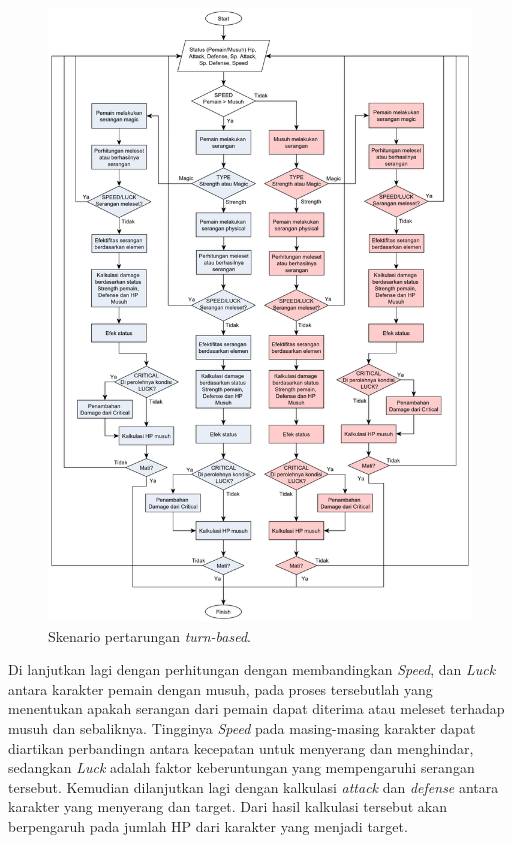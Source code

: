 \begin{enumerate}[label=\textbf{\arabic*).}]
	\begin{figure} [!h] 
		\includegraphics[scale=0.105]{img/battle_system_new_new.png}
		\caption{Skenario pertarungan \textit{turn-based}.}
		\label{fig:battle_system}
	\end{figure}
	
	Di lanjutkan lagi dengan perhitungan dengan membandingkan \textit{Speed}, dan \textit{Luck} antara karakter pemain dengan musuh, pada proses tersebutlah yang menentukan apakah serangan dari pemain dapat diterima atau meleset terhadap musuh dan sebaliknya. Tingginya \textit{Speed} pada masing-masing karakter dapat diartikan perbandingn antara kecepatan untuk menyerang dan menghindar, sedangkan \textit{Luck} adalah faktor keberuntungan yang mempengaruhi serangan tersebut. Kemudian dilanjutkan lagi dengan kalkulasi \textit{attack} dan \textit{defense} antara karakter yang menyerang dan target. Dari hasil kalkulasi tersebut akan berpengaruh pada jumlah HP dari karakter yang menjadi target.
	\vspace{1ex}
	

\end{enumerate}
